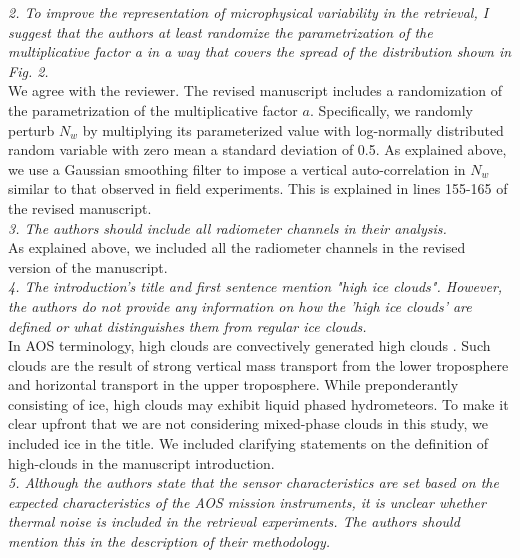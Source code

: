\documentclass[12pt]{article}
\begin{document}
\noindent
\textit{2. To improve the representation of microphysical variability in the retrieval, I suggest that the authors at 
    least randomize the parametrization of the multiplicative factor a in a way that covers the spread of the distribution 
    shown in Fig. 2.}\\
\newline
We agree with the reviewer. The revised manuscript includes a randomization of the parametrization of the multiplicative factor $a$.  Specifically,
we randomly perturb $N_w$ by multiplying its parameterized value with log-normally distributed
random variable with zero mean a standard deviation of 0.5.  As explained above, we use a Gaussian smoothing filter to impose a
vertical auto-correlation in
$N_w$ similar to that observed in field experiments. This is explained in lines 155-165 of the revised manuscript.\\
\newline
\textit{3. The authors should include all radiometer channels in their analysis.}\\
\newline
As explained above, we included all the radiometer channels in the revised version of the manuscript.\\
\newline
\textit{4. The introduction's title and first sentence mention "high ice clouds". However, the authors do not provide any 
    information on how the 'high ice clouds' are defined or what distinguishes them from regular ice clouds.}\\
\newline
In AOS terminology, high clouds are convectively generated high clouds \cite{braun2022}. Such clouds are the result of strong vertical mass transport 
from the lower troposphere and horizontal transport in the upper troposphere.  While preponderantly consisting of ice, high clouds may exhibit 
liquid phased hydrometeors. To make it clear upfront that we are not considering mixed-phase clouds in this study, we included ice in the title.
We included clarifying statements on the definition of high-clouds in the manuscript introduction. \\
\newline
\textit{5. Although the authors state that the sensor characteristics are set based on the expected characteristics of the 
    AOS mission instruments, it is unclear whether thermal noise is included in the retrieval experiments. 
    The authors should mention this in the description of their methodology.}\\
\end{document}
